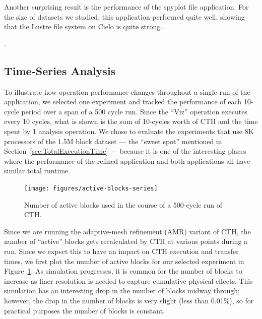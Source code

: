 Another surprising result is the performance of the spyplot file application.
For the size of datasets we studied, this application performed quite well, showing that
the Lustre file system on Cielo is quite strong.

.


\FloatBarrier

\subsection{Time-Series Analysis}

To illustrate how operation performance changes throughout a single run
of the application, we selected one experiment and tracked the performance of
each 10-cycle period over a span of a 500 cycle run.  Since the ``Viz''
operation executes every 10 cycles, what is shown is the sum of 10-cycles worth
of CTH and the time spent by 1 analysis operation. We chose to evaluate
the experiments that use 8K processors of the 1.5M block dataset --- the ``sweet
spot'' mentioned in Section~\ref{sec:TotalExecutionTime} --- because it is one of
the interesting places where the performance of the refined \insitu application
and both \intransit applications all have similar total runtime.

\begin{figure}[bp]
\begin{centering}
\texttt{[image: figures/active-blocks-series]}
\caption[Active Blocks]{Number of active blocks used in the course of a
500-cycle run of CTH.}
\label{fig:active-blocks}
\end{centering}
\end{figure}

Since we are running the adaptive-mesh refinement (AMR)
variant of CTH, the number of ``active'' blocks gets
recalculated by CTH at various points during a run. Since we expect this
to have an impact on CTH execution and \intransit transfer times, we first plot
the number of active blocks for our selected experiment in
Figure~\ref{fig:active-blocks}.  As simulation progresses, it is common for
the number of blocks to increase as finer resolution is needed to capture
cumulative physical effects.  This simulation has an interesting drop in
the number of blocks midway through; however, the drop in the number of
blocks is very slight (less than 0.01\%), so for practical purposes the
number of blocks is constant.

